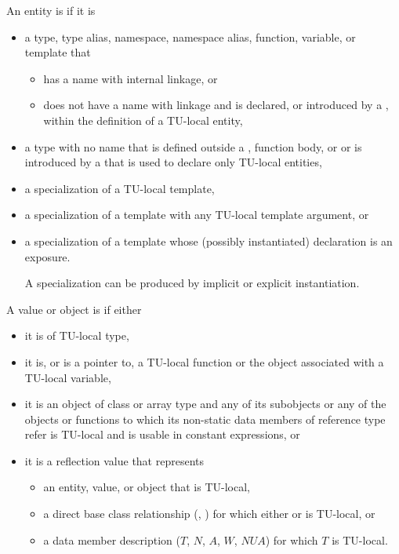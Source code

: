 \pnum
An entity is  if it is
\begin{itemize}
\item
a type, type alias, namespace, namespace alias, function, variable, or template that
\begin{itemize}
\item
has a name with internal linkage, or
\item
does not have a name with linkage and is declared,
or introduced by a ,
within the definition of a TU-local entity,
\end{itemize}
\item
a type with no name that is defined outside a
,
function body, or
or is introduced by a 
that is used to declare only TU-local entities,
\item
a specialization of a TU-local template,
\item
a specialization of a template with any TU-local template argument, or
\item
a specialization of a template
whose (possibly instantiated) declaration is an exposure.
\begin{note}
A specialization can be produced by implicit or explicit instantiation.
\end{note}
\end{itemize}

\pnum
A value or object is  if either
\begin{itemize}
\item
it is of TU-local type,
\item
it is, or is a pointer to,
a TU-local function or the object associated with a TU-local variable,
\item
it is an object of class or array type and
any of its subobjects or
any of the objects or functions
to which its non-static data members of reference type refer
is TU-local and is usable in constant expressions, or
\item
it is a reflection value that represents
\begin{itemize}
\item
an entity, value, or object that is TU-local,
\item
a direct base class relationship (, )
for which either  or  is TU-local, or
\item
a data member description ($T$, $N$, $A$, $W$, $\mathit{NUA}$)
for which $T$ is TU-local.
\end{itemize}
\end{itemize}

